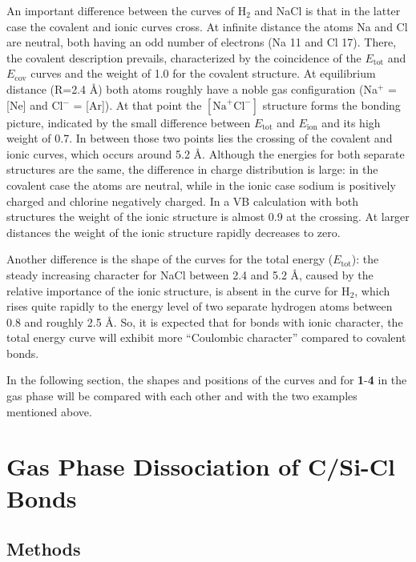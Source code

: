 An important difference between the curves of H$_2$ and NaCl is that in the latter case the covalent and ionic curves cross. At infinite distance the atoms Na and Cl are neutral, both having an odd number of electrons (Na 11 and Cl 17). There, the covalent description prevails, characterized by the coincidence of the $E_\mathrm{tot}$ and $E_\mathrm{cov}$ curves and the weight of 1.0 for the covalent structure. At equilibrium distance (R=2.4 \AA) both atoms roughly have a noble gas configuration (Na$^{+}$ = [Ne] and Cl$^{-}$ = [Ar]). At that point the $[\mathrm{Na}^{+}\mathrm{Cl}^{-}]$ structure forms the bonding picture, indicated by the small difference between $E_\mathrm{tot}$ and $E_\mathrm{ion}$ and its high weight of 0.7. In between those two points lies the crossing of the covalent and ionic curves, which occurs around 5.2 \AA. Although the energies for both separate structures are the same, the difference in charge distribution is large: in the covalent case the atoms are neutral, while in the ionic case sodium is positively charged and chlorine negatively charged. In a VB calculation with both structures the weight of the ionic structure is almost 0.9 at the crossing. At larger distances the weight of the ionic structure rapidly decreases to zero.

Another difference is the shape of the curves for the total energy ($E_\mathrm{tot}$): the steady increasing character for NaCl between 2.4 and 5.2 \AA, caused by the relative importance of the ionic structure, is absent in the curve for H$_2$, which rises quite rapidly to the energy level of two separate hydrogen atoms between 0.8 and roughly 2.5 \AA. So, it is expected that for bonds with ionic character, the total energy curve will exhibit more ``Coulombic character'' compared to covalent bonds. 

In the following section, the shapes and positions of the curves and for \textbf{1}-\textbf{4} in the gas phase will be compared with each other and with the two examples mentioned above.

\section{\label{ch3.sec.gasphase}Gas Phase Dissociation of C/Si-Cl Bonds}

\subsection{Methods}

